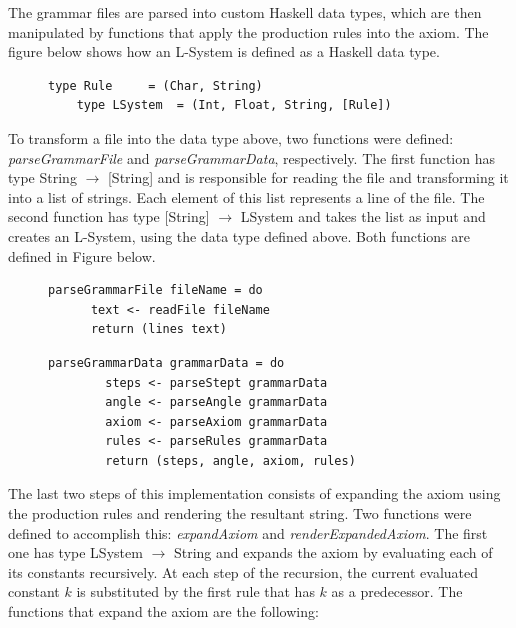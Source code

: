 \documentclass{article}
\begin{document}
The grammar files are parsed into custom Haskell data types, which are then
manipulated by functions that apply the production rules into the axiom. The figure
below shows how an L-System is defined as a Haskell data type.

\begin{figure}[!h]
\centering
\begin{lstlisting}[style=BashStyle]
    type Rule     = (Char, String)
    type LSystem  = (Int, Float, String, [Rule])
\end{lstlisting}
\vskip -6pt
\end{figure}

To transform a file into the data type above, two functions were defined:
\textit{parseGrammarFile} and \textit{parseGrammarData}, respectively. The first function has
type String $\rightarrow$ [String] and is responsible for reading the file
and transforming it into a list of strings. Each element of this list represents
a line of the file. The second function has type [String] $\rightarrow$ LSystem
and takes the list as input and creates an L-System, using the data type defined above.
Both functions are defined in Figure below.

\begin{figure}[!h]
\centering
\begin{lstlisting}[style=BashStyle]
    parseGrammarFile fileName = do
      text <- readFile fileName
      return (lines text)
\end{lstlisting}
\begin{lstlisting}[style=BashStyle]
    parseGrammarData grammarData = do
        steps <- parseStept grammarData
        angle <- parseAngle grammarData
        axiom <- parseAxiom grammarData
        rules <- parseRules grammarData
        return (steps, angle, axiom, rules)
\end{lstlisting}
\vskip -6pt
\end{figure}

The last two steps of this implementation consists of expanding the axiom using
the production rules and rendering the resultant string. Two functions were
defined to accomplish this: \textit{expandAxiom} and \textit{renderExpandedAxiom}.
The first one has type LSystem $\rightarrow$ String and expands the axiom by
evaluating each of its constants recursively. At each step of the recursion, the
current evaluated constant $k$ is substituted by the first rule that has $k$
as a predecessor. The functions that expand the axiom are the following:
\end{document}
